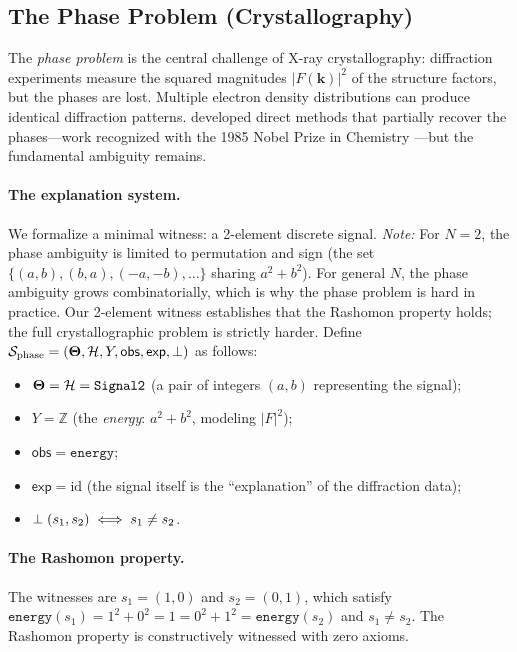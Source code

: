 \subsection{The Phase Problem (Crystallography)}
\label{sec:instance-phase-problem}

The \emph{phase problem} is the central challenge of X-ray crystallography:
diffraction experiments measure the squared magnitudes $|F(\mathbf{k})|^2$ of
the structure factors, but the phases are lost.  Multiple electron density
distributions can produce identical diffraction patterns.
\citet{hauptman1953solution} developed direct methods that partially recover
the phases---work recognized with the 1985 Nobel Prize in Chemistry
\citep{karle1956structure}---but the fundamental ambiguity remains.

\paragraph{The explanation system.}
We formalize a minimal witness: a 2-element discrete signal.
\emph{Note:} For $N = 2$, the phase ambiguity is limited to permutation and
sign (the set $\{(a,b), (b,a), (-a,-b), \ldots\}$ sharing $a^2+b^2$).
For general $N$, the phase ambiguity grows combinatorially, which is why the
phase problem is hard in practice.  Our 2-element witness establishes that the
Rashomon property holds; the full crystallographic problem is strictly harder.
Define $\mathcal{S}_{\mathrm{phase}} = (\mathbf{\Theta}, \mathcal{H}, Y, \mathsf{obs},
\mathsf{exp}, \perp)$ as follows:
\begin{itemize}
  \item $\mathbf{\Theta} = \mathcal{H} = \texttt{Signal2}$ (a pair of integers $(a, b)$
    representing the signal);
  \item $Y = \mathbb{Z}$ (the \emph{energy}: $a^2 + b^2$, modeling $|F|^2$);
  \item $\mathsf{obs} = \texttt{energy}$;
  \item $\mathsf{exp} = \mathrm{id}$ (the signal itself is the ``explanation''
    of the diffraction data);
  \item $\perp(s_1, s_2) \iff s_1 \ne s_2$.
\end{itemize}

\paragraph{The Rashomon property.}
The witnesses are $s_1 = (1, 0)$ and $s_2 = (0, 1)$, which satisfy
$\texttt{energy}(s_1) = 1^2 + 0^2 = 1 = 0^2 + 1^2 = \texttt{energy}(s_2)$
and $s_1 \ne s_2$.  The Rashomon property is constructively witnessed with
zero axioms.

